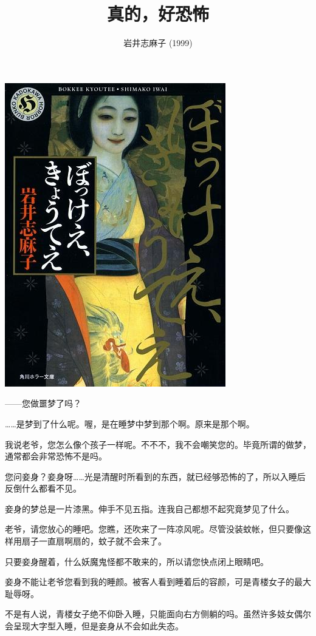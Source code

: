 \documentclass[portrait,a4paper]{article}
\title{真的，好恐怖}
\author{岩井志麻子 (1999)}
\date{}
\begin{document}
\maketitle

\includegraphics[scale=1.0,angle=90,origin=c]{cover-真的，好恐怖.jpg}

——您做噩梦了吗？

……是梦到了什么呢。喔，是在睡梦中梦到那个啊。原来是那个啊。

我说老爷，您怎么像个孩子一样呢。不不不，我不会嘲笑您的。毕竟所谓的做梦，通常都会非常恐怖不是吗。

您问妾身？妾身呀……光是清醒时所看到的东西，就已经够恐怖的了，所以入睡后反倒什么都看不见。

妾身的梦总是一片漆黑。伸手不见五指。连我自己都想不起究竟梦见了什么。

老爷，请您放心的睡吧。您瞧，还吹来了一阵凉风呢。尽管没装蚊帐，但只要像这样用扇子一直扇啊扇的，蚊子就不会来了。

只要妾身醒着，什么妖魔鬼怪都不敢来的，所以请您快点闭上眼睛吧。

妾身不能让老爷您看到我的睡颜。被客人看到睡着后的容颜，可是青楼女子的最大耻辱呀。

不是有人说，青楼女子绝不仰卧入睡，只能面向右方侧躺的吗。虽然许多妓女偶尔会呈现大字型入睡，但是妾身从不会如此失态。
\end{document}
